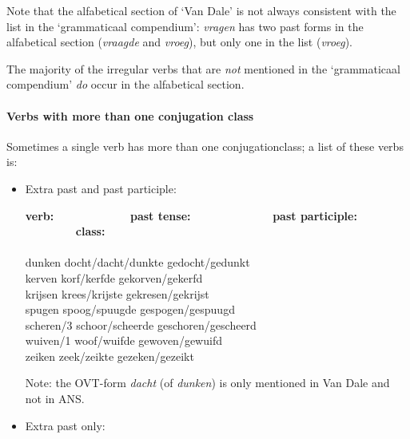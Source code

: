 Note that the alfabetical section of `Van Dale' is not always consistent 
with the list in the `grammaticaal compendium': {\em vragen} has two past 
forms in the alfabetical section ({\em vraagde} and {\em vroeg}), but only 
one in the list ({\em vroeg}). 

The majority of the irregular verbs that are {\em not} mentioned in the 
`grammaticaal compendium' {\em do} occur in the alfabetical section.

\paragraph{Verbs with more than one conjugation class}

Sometimes a single verb has more than one conjugationclass;
a list of these verbs is:

\begin{itemize}

\item Extra past and past participle:

\begin{tabbing}
{\bf verb:}   \ \ \ \ \ \ \ \ \ \ \ \ \     \=   
{\bf past tense:}  \ \ \ \ \ \ \ \ \ \ \ \ \ \    \=    
{\bf past participle:}  \ \ \ \ \ \ \ \ \  \=
{\bf class:} \\
           \>                 \>                     \>                   \\
dunken     \> docht/dacht/dunkte \>  gedocht/gedunkt \>    [9, 3, 13]     \\
kerven     \> korf/kerfde     \> gekorven/gekerfd    \>    [7, 3]         \\
krijsen    \> krees/krijste   \> gekresen/gekrijst   \>    [7, 3]         \\
spugen     \> spoog/spuugde   \> gespogen/gespuugd   \>    [7, 3]         \\
scheren/3  \> schoor/scheerde \> geschoren/gescheerd \>    [7, 3]         \\
wuiven/1   \> woof/wuifde     \> gewoven/gewuifd     \>    [7, 3]         \\ 
zeiken     \> zeek/zeikte     \> gezeken/gezeikt     \>    [7, 3]         \\
\end{tabbing}

Note: the OVT-form {\em dacht} (of {\em dunken}) is only mentioned in 
Van Dale and not in ANS.

\item Extra past only:


\end{itemize}
